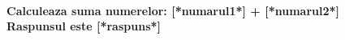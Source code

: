 \documentclass{exam}
\begin{document}
\paragraph{
Calculeaza suma numerelor: [*numarul1*] + [*numarul2*]\\
Raspunsul este [*raspuns*]
}
\end{document}
